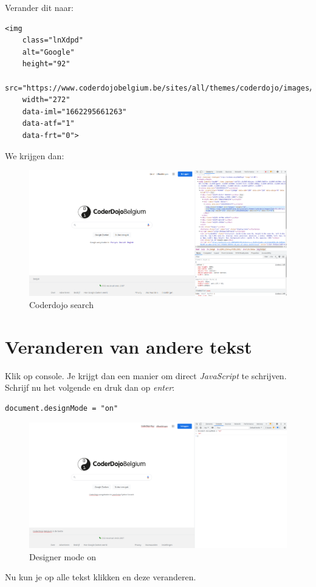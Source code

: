 Verander dit naar:
\begin{verbatim}
<img 
    class="lnXdpd"
    alt="Google"
    height="92"
    src="https://www.coderdojobelgium.be/sites/all/themes/coderdojo/images/CoderDojoBelgiumLogo.svg" 
    width="272" 
    data-iml="1662295661263" 
    data-atf="1" 
    data-frt="0">
\end{verbatim}

We krijgen dan:
\begin{figure}[htpb]
    \centering
    \includegraphics[width=0.6\linewidth]{figures/coderdojo_search.png}
    \caption{Coderdojo search}
    \label{fig:coderdojo_search}
\end{figure}

\section{Veranderen van andere tekst}

Klik op console. Je krijgt dan een manier om direct \emph{JavaScript} te
schrijven. Schrijf nu het volgende en druk dan op \emph{enter}:
\begin{verbatim}
document.designMode = "on"
\end{verbatim}

\begin{figure}[htpb]
    \centering
    \includegraphics[width=0.6\linewidth]{figures/designer_mode_on.png}
    \caption{Designer mode on}
    \label{fig:designer_mode_on}
\end{figure}

Nu kun je op alle tekst klikken en deze veranderen.
